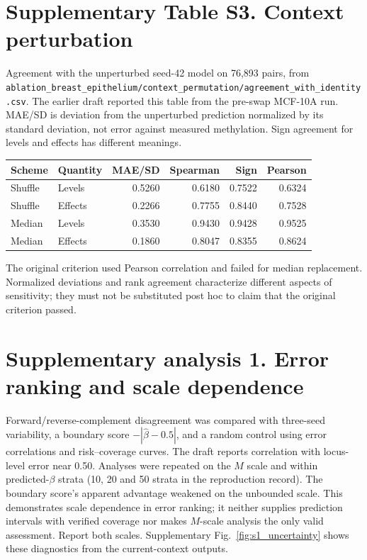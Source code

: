 \documentclass[10pt]{article}
\begin{document}
\section*{Supplementary Table S3. Context perturbation}
Agreement with the unperturbed seed-42 model on 76,893 pairs, from \texttt{ablation\_breast\_epithelium/context\_permutation/agreement\_with\_identity.csv}. The earlier draft reported this table from the pre-swap MCF-10A run. MAE/SD is deviation from the unperturbed prediction normalized by its standard deviation, not error against measured methylation. Sign agreement for levels and effects has different meanings.
\begin{center}\small
\begin{tabular}{llrrrr}\toprule
Scheme & Quantity & MAE/SD & Spearman & Sign & Pearson\\\midrule
Shuffle & Levels & 0.5260 & 0.6180 & 0.7522 & 0.6324\\
Shuffle & Effects & 0.2266 & 0.7755 & 0.8440 & 0.7528\\
Median & Levels & 0.3530 & 0.9430 & 0.9428 & 0.9525\\
Median & Effects & 0.1860 & 0.8047 & 0.8355 & 0.8624\\\bottomrule
\end{tabular}\end{center}
The original criterion used Pearson correlation and failed for median replacement. Normalized deviations and rank agreement characterize different aspects of sensitivity; they must not be substituted post hoc to claim that the original criterion passed.

\section*{Supplementary analysis 1. Error ranking and scale dependence}
Forward/reverse-complement disagreement was compared with three-seed variability, a boundary score $-|\widehat\beta-0.5|$, and a random control using error correlations and risk--coverage curves. The draft reports correlation with locus-level error near 0.50. Analyses were repeated on the $M$ scale and within predicted-$\beta$ strata (10, 20 and 50 strata in the reproduction record). The boundary score's apparent advantage weakened on the unbounded scale. This demonstrates scale dependence in error ranking; it neither supplies prediction intervals with verified coverage nor makes $M$-scale analysis the only valid assessment. Report both scales. Supplementary Fig.~\ref{fig:s1_uncertainty} shows these diagnostics from the current-context outputs.
\end{document}

